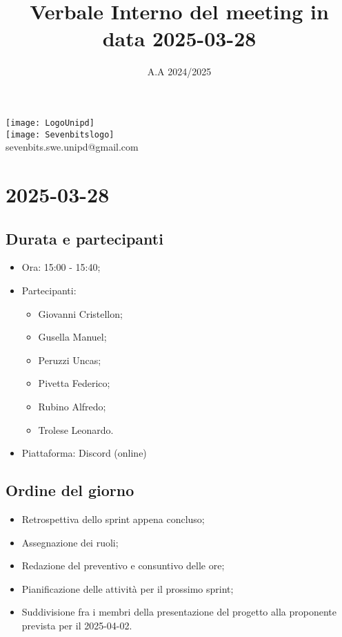 \documentclass[10pt]{article}
\title{Verbale Interno del meeting in data 2025-03-28} %
\date{A.A 2024/2025}
\begin{document}
\maketitle
\center 
\texttt{[image: LogoUnipd]}\\
\texttt{[image: Sevenbitslogo]}\\
sevenbits.swe.unipd@gmail.com\\
\vspace{2mm}

\newpage
\raggedright
\tableofcontents
\newpage

\section{2025-03-28} %
\subsection{Durata e partecipanti}
\begin{itemize}
\item Ora: 15:00 - 15:40; %
\item Partecipanti: 	
        \begin{itemize}
            \item Giovanni Cristellon;
            \item Gusella Manuel;
            \item Peruzzi Uncas;
            \item Pivetta Federico;
            \item Rubino Alfredo;
            \item Trolese Leonardo.
        \end{itemize}
\item Piattaforma: Discord (online)
\end{itemize}

\subsection{Ordine del giorno}
\begin{itemize}
    \item Retrospettiva dello sprint appena concluso;
    \item Assegnazione dei ruoli;
    \item Redazione del preventivo e consuntivo delle ore;
    \item Pianificazione delle attività per il prossimo sprint;
    \item Suddivisione fra i membri della presentazione del progetto alla proponente prevista per il 2025-04-02.
\end{itemize}
\end{document}
